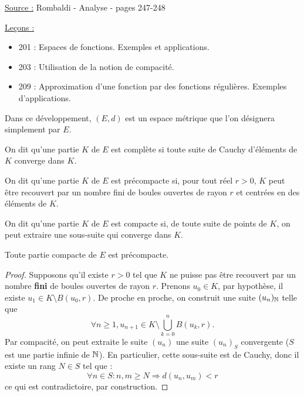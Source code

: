 

\pagestyle{fancy}

\fancyhead[R]{}



\underline{Source :} Rombaldi - Analyse - pages 247-248

\underline{Leçons :}
\begin{itemize}
\item 201 : Espaces de fonctions. Exemples et applications.
\item 203 : Utilisation de la notion de compacité.
\item 209 : Approximation d’une fonction par des fonctions régulières. Exemples d’applications.
\end{itemize}

Dans ce développement, $(E,d)$ est un espace métrique que l'on désignera simplement par $E$.	

\begin{defn}[Complétude]
On dit qu'une partie $K$ de $E$ est complète si toute suite de Cauchy d'éléments de $K$ converge dans $K$.
\end{defn}

\begin{defn}[Précompacité]
On dit qu'une partie $K$ de $E$ est précompacte si, pour tout réel $r>0$, 
$K$ peut être recouvert par un nombre fini de boules ouvertes de rayon $r$ et centrées en des éléments de $K$. 
\end{defn}

\begin{defn}[Compacité]
On dit qu'une partie $K$ de $E$ est compacte si, de toute suite de points de $K$, on peut extraire une sous-suite qui converge 
dans $K$.
\end{defn}

\begin{lem}
\label{lem:precomp}
Toute partie compacte de $E$ est précompacte.
\end{lem}

\begin{proof}
Supposons qu'il existe $r>0$ tel que $K$ ne puisse pas être recouvert par un nombre \textbf{fini} de boules ouvertes de rayon $r$.
Prenons $u_0 \in K$, par hypothèse, il existe $u_1 \in K \setminus B(u_0,r)$.
De proche en proche, on construit une suite $(u_n)_{\mathbb{N}}$ telle que
\[ \forall n \geq 1, u_{n+1} \in K \setminus \bigcup_{k=0}^{n} B(u_k, r). \]
Par compacité, on peut extraite le suite $(u_n)$ une suite $(u_n)_S$ convergente ($S$ est une partie infinie de $\mathbb{N}$). 
En particulier, cette sous-suite est de Cauchy, donc il existe un rang $N \in S$ tel que :
\[ \forall n \in S : n, m \geq N \Rightarrow d(u_n,u_m) < r \]
ce qui est contradictoire, par construction.
\end{proof}

